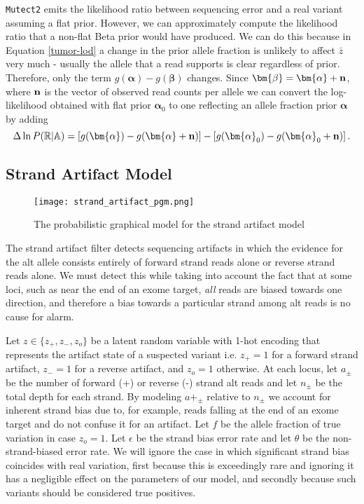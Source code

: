 \documentclass[nofootinbib,amssymb,amsmath]{revtex4}
\newcommand{\vn}{{\bf n}}
\newcommand{\valpha}{{\bm{\alpha}}}
\newcommand{\vbeta}{{\bm{\beta}}}
\newcommand{\code}[1]{\texttt{#1}}
\begin{document}
\code{Mutect2} emits the likelihood ratio between sequencing error and a real variant assuming a flat prior.  However, we can approximately compute the likelihood ratio that a non-flat Beta prior would have produced.  We can do this because in Equation \ref{tumor-lod} a change in the prior allele fraction is unlikely to affect $\bar{z}$ very much - usually the allele that a read supports is clear regardless of prior.  Therefore, only the term $g(\valpha) - g(\vbeta)$ changes.  Since $\vbeta = \valpha + \vn$, where $\vn$ is the vector of observed read counts per allele we can convert the log-likelihood obtained with flat prior $\valpha_0$ to one reflecting an allele fraction prior $\valpha$ by adding
\begin{equation}
\Delta \ln P(\mathbb{R} | \mathbb{A}) = \left[ g(\valpha) - g(\valpha + \vn) \right] - \left[ g(\valpha_0) - g(\valpha_0 + \vn) \right].
\end{equation}




\subsection{Strand Artifact Model}

\begin{figure}
\centering
\texttt{[image: strand\_artifact\_pgm.png]}
\caption{\label{fig:strand artifact}The probabilistic graphical model for the strand artifact model}
\end{figure}

The strand artifact filter detects sequencing artifacts in which the evidence for the alt allele consists entirely of forward strand reads alone or reverse strand reads alone. We must detect this while taking into account the fact that at some loci, such as near the end of an exome target, \emph{all} reads are biased towards one direction, and therefore a bias towards a particular strand among alt reads is no cause for alarm.

Let $z \in \{ z_+, z_-, z_o \}$ be a latent random variable with 1-hot encoding that represents the artifact state of a suspected variant i.e. $z_+ = 1$ for a forward strand artifact, $z_- = 1$ for a reverse artifact, and $z_o = 1$ otherwise. At each locus, let $a_\pm$ be the number of forward (+) or reverse (-) strand alt reads and let $n_\pm$ be the total depth for each strand.  By modeling $a+_\pm$ relative to $n_\pm$ we account for inherent strand bias due to, for example, reads falling at the end of an exome target and do not confuse it for an artifact.  Let $f$ be the allele fraction of true variation in case $z_o = 1$.  Let $\epsilon$ be the strand bias error rate and let $\theta$ be the non-strand-biased error rate.  We will ignore the case in which significant strand bias coincides with real variation, first because this is exceedingly rare and ignoring it has a negligible effect on the parameters of our model, and secondly because such variants should be considered true positives.
\end{document}
